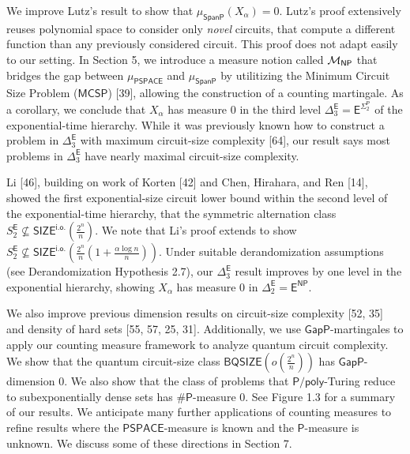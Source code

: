 \documentclass[10pt,a4paper]{article}
\begin{document}
We improve Lutz’s result to show that $\mu_{\mathsf{SpanP}}(X_{\alpha})=0$. Lutz’s proof extensively reuses polynomial space to consider only \emph{novel} circuits, that compute a different function than any previously considered circuit. This proof does not adapt easily to our setting. In Section 5, we introduce a measure notion called ${{\cal M}_{\mathsf{NP}}}$ that bridges the gap between
$\mu_{\mathsf{PSPACE}}$ and $\mu_{\mathsf{SpanP}}$ by utilitizing the Minimum Circuit Size Problem ($\mathsf{MCSP}$) [39], allowing the construction of a counting martingale.
As a corollary, we conclude that
$X_{\alpha}$ has measure 0 in the third level
$\Delta^{\mathsf{E}}_{3}=\mathsf{E}^{\Sigma^{\mathsf{P}}_{2}}$ of the exponential-time hierarchy. While it was previously known how to construct a problem in $\Delta^{\mathsf{E}}_{3}$ with maximum circuit-size complexity [64], our result says most problems in $\Delta^{\mathsf{E}}_{3}$ have nearly maximal circuit-size complexity.\par




Li [46], building on work of Korten [42] and Chen, Hirahara, and Ren [14], showed the first exponential-size circuit lower bound within the second level of the exponential-time hierarchy, that the symmetric alternation class $S^{\mathsf{E}}_{2}\not\subseteq\mathsf{SIZE}^{\mathsf{i.o.}}\!\!(\frac{2^{n}}{n}).$ We note that Li’s proof extends to show
$S^{\mathsf{E}}_{2}\not\subseteq\mathsf{SIZE}^{\mathsf{i.o.}}\!\!\left(\frac{2^{n}}{n}\!\left(1+\frac{\alpha\log n}{n}\right)\right)$.
Under suitable derandomization assumptions (see Derandomization Hypothesis 2.7), our $\Delta^{\mathsf{E}}_{3}$ result improves by one level in the exponential hierarchy, showing $X_{\alpha}$ has measure 0 in
$\Delta^{\mathsf{E}}_{2}=\mathsf{E}^{\mathsf{NP}}$.\par




We also improve previous dimension results on circuit-size complexity [52, 35] and density of hard sets [55, 57, 25, 31].
Additionally, we use $\mathsf{GapP}$-martingales to apply our counting measure framework to analyze quantum circuit complexity. We show that the quantum circuit-size class $\mathsf{BQSIZE}\left(o\left(\frac{2^{n}}{n}\right)\right)$ has $\mathsf{GapP}$-dimension 0.
We also show that the class of
problems that ${\mathsf{P}/\mathsf{poly}}$-Turing
reduce to subexponentially dense sets has
${\mathsf{\#}\mathsf{P}}$-measure 0.
See Figure 1.3 for a summary of our results.
We anticipate many further applications of counting measures to refine results where the $\mathsf{PSPACE}$-measure is known and the $\mathsf{P}$-measure is unknown. We discuss some of these directions in Section 7.\par
\end{document}

